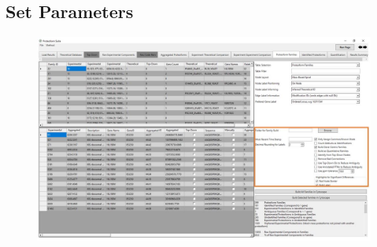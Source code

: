 \subsection{Set Parameters}
\begin{figure}[h]
\centering
\includegraphics[scale=0.5]{figures/families1.jpg}
\end{figure}
